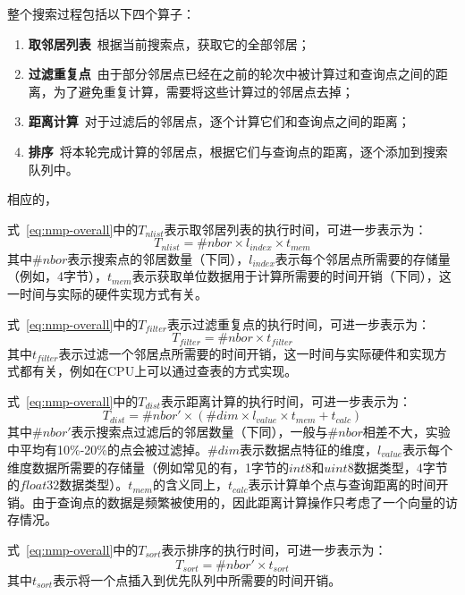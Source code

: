 整个搜索过程包括以下四个算子：
\begin{enumerate}
  \item \textbf{取邻居列表}~根据当前搜索点，获取它的全部邻居；
  \item \textbf{过滤重复点}~由于部分邻居点已经在之前的轮次中被计算过和查询点之间的距离，为了避免重复计算，需要将这些计算过的邻居点去掉；
  \item \textbf{距离计算}~对于过滤后的邻居点，逐个计算它们和查询点之间的距离；
  \item \textbf{排序}~将本轮完成计算的邻居点，根据它们与查询点的距离，逐个添加到搜索队列中。
\end{enumerate}

相应的，

式~\ref{eq:nmp-overall}中的$T_{nlist}$表示取邻居列表的执行时间，可进一步表示为：
\begin{equation}
  T_{nlist}=\#nbor\times l_{index}\times t_{mem}
\end{equation}
其中$\#nbor$表示搜索点的邻居数量（下同），$l_{index}$表示每个邻居点所需要的存储量（例如，4字节），$t_{mem}$表示获取单位数据用于计算所需要的时间开销（下同），这一时间与实际的硬件实现方式有关。

式~\ref{eq:nmp-overall}中的$T_{filter}$表示过滤重复点的执行时间，可进一步表示为：
\begin{equation}
  T_{filter}=\#nbor\times t_{filter}
\end{equation}
其中$t_{filter}$表示过滤一个邻居点所需要的时间开销，这一时间与实际硬件和实现方式都有关，例如在CPU上可以通过查表的方式实现。

式~\ref{eq:nmp-overall}中的$T_{dist}$表示距离计算的执行时间，可进一步表示为：
\begin{equation}
  T_{dist}=\#nbor\prime \times \left(\#dim\times l_{value}\times t_{mem} + t_{calc} \right)
\end{equation}
其中$\#nbor\prime$表示搜索点过滤后的邻居数量（下同），一般与$\#nbor$相差不大，实验中平均有10\%-20\%的点会被过滤掉。$\#dim$表示数据点特征的维度，$l_{value}$表示每个维度数据所需要的存储量（例如常见的有，1字节的$int8$和$uint8$数据类型，4字节的$float32$数据类型）。$t_{mem}$的含义同上，$t_{calc}$表示计算单个点与查询距离的时间开销。由于查询点的数据是频繁被使用的，因此距离计算操作只考虑了一个向量的访存情况。

式~\ref{eq:nmp-overall}中的$T_{sort}$表示排序的执行时间，可进一步表示为：
\begin{equation}
  T_{sort}=\#nbor\prime \times t_{sort}
\end{equation}
其中$t_{sort}$表示将一个点插入到优先队列中所需要的时间开销。

